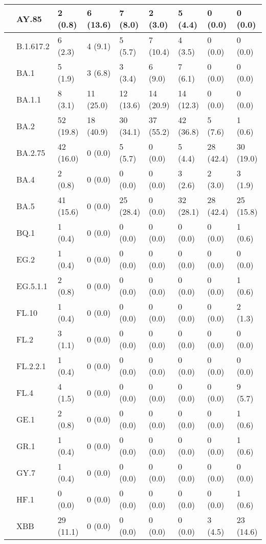 \begin{tabular}{l|l|l|l|l|l|l|l|l}
\hline
 & AY.85 & 2 (0.8) & 6 (13.6) & 7 (8.0) & 2 (3.0) & 5 (4.4) & 0 (0.0) & 0 (0.0)\\
\hline
 & B.1.617.2 & 6 (2.3) & 4 (9.1) & 5 (5.7) & 7 (10.4) & 4 (3.5) & 0 (0.0) & 0 (0.0)\\
\hline
 & BA.1 & 5 (1.9) & 3 (6.8) & 3 (3.4) & 6 (9.0) & 7 (6.1) & 0 (0.0) & 0 (0.0)\\
\hline
 & BA.1.1 & 8 (3.1) & 11 (25.0) & 12 (13.6) & 14 (20.9) & 14 (12.3) & 0 (0.0) & 0 (0.0)\\
\hline
 & BA.2 & 52 (19.8) & 18 (40.9) & 30 (34.1) & 37 (55.2) & 42 (36.8) & 5 (7.6) & 1 (0.6)\\
\hline
 & BA.2.75 & 42 (16.0) & 0 (0.0) & 5 (5.7) & 0 (0.0) & 5 (4.4) & 28 (42.4) & 30 (19.0)\\
\hline
 & BA.4 & 2 (0.8) & 0 (0.0) & 0 (0.0) & 0 (0.0) & 3 (2.6) & 2 (3.0) & 3 (1.9)\\
\hline
 & BA.5 & 41 (15.6) & 0 (0.0) & 25 (28.4) & 0 (0.0) & 32 (28.1) & 28 (42.4) & 25 (15.8)\\
\hline
 & BQ.1 & 1 (0.4) & 0 (0.0) & 0 (0.0) & 0 (0.0) & 0 (0.0) & 0 (0.0) & 1 (0.6)\\
\hline
 & EG.2 & 1 (0.4) & 0 (0.0) & 0 (0.0) & 0 (0.0) & 0 (0.0) & 0 (0.0) & 0 (0.0)\\
\hline
 & EG.5.1.1 & 2 (0.8) & 0 (0.0) & 0 (0.0) & 0 (0.0) & 0 (0.0) & 0 (0.0) & 1 (0.6)\\
\hline
 & FL.10 & 1 (0.4) & 0 (0.0) & 0 (0.0) & 0 (0.0) & 0 (0.0) & 0 (0.0) & 2 (1.3)\\
\hline
 & FL.2 & 3 (1.1) & 0 (0.0) & 0 (0.0) & 0 (0.0) & 0 (0.0) & 0 (0.0) & 0 (0.0)\\
\hline
 & FL.2.2.1 & 1 (0.4) & 0 (0.0) & 0 (0.0) & 0 (0.0) & 0 (0.0) & 0 (0.0) & 0 (0.0)\\
\hline
 & FL.4 & 4 (1.5) & 0 (0.0) & 0 (0.0) & 0 (0.0) & 0 (0.0) & 0 (0.0) & 9 (5.7)\\
\hline
 & GE.1 & 2 (0.8) & 0 (0.0) & 0 (0.0) & 0 (0.0) & 0 (0.0) & 0 (0.0) & 1 (0.6)\\
\hline
 & GR.1 & 1 (0.4) & 0 (0.0) & 0 (0.0) & 0 (0.0) & 0 (0.0) & 0 (0.0) & 1 (0.6)\\
\hline
 & GY.7 & 1 (0.4) & 0 (0.0) & 0 (0.0) & 0 (0.0) & 0 (0.0) & 0 (0.0) & 0 (0.0)\\
\hline
 & HF.1 & 0 (0.0) & 0 (0.0) & 0 (0.0) & 0 (0.0) & 0 (0.0) & 0 (0.0) & 1 (0.6)\\
\hline
 & XBB & 29 (11.1) & 0 (0.0) & 0 (0.0) & 0 (0.0) & 0 (0.0) & 3 (4.5) & 23 (14.6)\\
\hline

\end{tabular}
